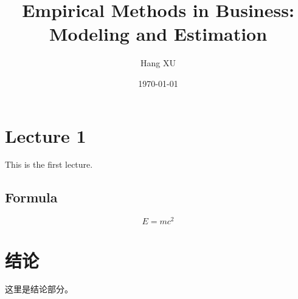 \documentclass[12pt,a4paper]{article}
\begin{document}
\title{Empirical Methods in Business: Modeling and Estimation}
\author{Hang XU}
\date{\today}
\maketitle

\section{Lecture 1}
This is the first lecture.

\subsection{Formula}

\begin{equation}
    E = mc^2
\end{equation}

\section{结论}
这里是结论部分。
\end{document}
